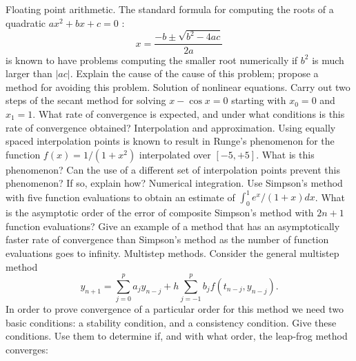 \documentclass[14pt]{extarticle}
\begin{document}
Floating point arithmetic. The standard formula for computing the roots of a quadratic $a x^{2}+b x+c=0$ :
$$
x=\frac{-b \pm \sqrt{b^{2}-4 a c}}{2 a}
$$
is known to have problems computing the smaller root numerically if $b^{2}$ is much larger than $|a c|$. Explain the cause of the cause of this problem; propose a method for avoiding this problem.
\newpage
Solution of nonlinear equations. Carry out two steps of the secant method for solving $x-\cos x=0$ starting with $x_{0}=0$ and $x_{1}=1$. What rate of convergence is expected, and under what conditions is this rate of convergence obtained?
\newpage
Interpolation and approximation. Using equally spaced interpolation points is known to result in Runge's phenomenon for the function $f(x)=1 /\left(1+x^{2}\right)$ interpolated over $[-5,+5]$. What is this phenomenon? Can the use of a different set of interpolation points prevent this phenomenon? If so, explain how?
\newpage
 Numerical integration. Use Simpson's method with five function evaluations to obtain an estimate of $\int_{0}^{1} e^{x} /(1+x) d x$. What is the asymptotic order of the error of composite Simpson's method with $2 n+1$ function evaluations? Give an example of a method that has an asymptotically faster rate of convergence than Simpson's method as the number of function evaluations goes to infinity.
\newpage
Multistep methods. Consider the general multistep method
$$
y_{n+1}=\sum_{j=0}^{p} a_{j} y_{n-j}+h \sum_{j=-1}^{p} b_{j} f\left(t_{n-j}, y_{n-j}\right) .
$$
In order to prove convergence of a particular order for this method we need two basic conditions: a stability condition, and a consistency condition. Give these conditions. Use them to determine if, and with what order, the leap-frog method converges:
\end{document}
